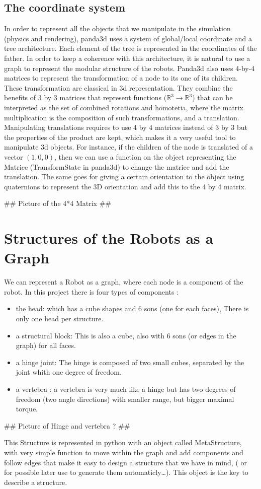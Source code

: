\subsection{The coordinate system}
In order to represent all the objects that we manipulate in the simulation (physics and rendering), panda3d uses a system of global/local coordinate and a tree architecture. Each element of the tree is represented in the coordinates of the father. In order to keep a coherence with this architecture, it is natural to use a graph to represent the modular structure of the robots. Panda3d also uses 4-by-4 matrices to represent the transformation of a node to its one of its children. These transformation are classical in 3d representation. They combine the benefits of 3 by 3 matrices that represent functions ($\mathbb{R}^3 \to \mathbb{R}^3$) that can be interpreted as the set of combined rotations and homotetia, where the matrix multiplication is the composition of such transformations, and a translation. Manipulating translations requires to use 4 by 4 matrices instead of 3 by 3 but the properties of the product are kept, which makes it a very useful tool to manipulate 3d objects. For instance, if the children of the node is translated of a vector $(1, 0, 0)$, then we can use a function on the object representing the Matrice (TransformState in panda3d) to change the matrice and add the translation. The same goes for giving a certain orientation to the object using quaternions to represent the 3D orientation and add this to the 4 by 4 matrix.

## Picture of the 4*4 Matrix ##

\section{Structures of the Robots as a Graph} 

We can represent a Robot as a graph, where each node is a component of the robot. In this project there is four types of components : 
\begin{itemize}
    \item the head: which has a cube shapes and 6 sons (one for each faces), There is only one head per structure.
    \item a structural block: This is also a cube, also with 6 sons (or edges in the graph) for all faces.
    \item a hinge joint: The hinge is composed of two small cubes, separated by the joint whith one degree of freedom.
    \item a vertebra : a vertebra is very much like a hinge but has two degrees of freedom (two angle directions) with smaller range, but bigger maximal torque.
\end{itemize}

## Picture of Hinge and vertebra ? ##

This Structure is represented in python with an object called MetaStructure, with very simple function to move within the graph and add components and follow edges that make it easy to design a structure that we have in mind, ( or for possible later use to generate them automaticly\ldots). This object is the key to describe a structure.  
    
